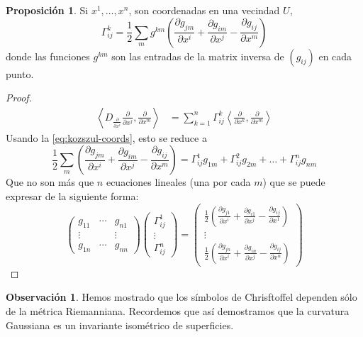 \documentclass[spanish]{book}
\theoremstyle{definition}
\newtheorem*{prop}{Proposición}
\newtheorem*{obs}{Observación}
\begin{document}
	\begin{prop}
		Si $x^1,\ldots,x^n$, son coordenadas en una vecindad $U$,
		\[\Gamma_{ij}^k = \frac{1}{2} \sum_m g^{km}\left( \frac{\partial g_{jm}}{\partial x^i} + \frac{\partial g_{im}}{\partial x^j} - \frac{\partial g_{ij}}{\partial x^m} \right)\]
		donde las funciones $g^{km}$ son las entradas de la matrix inversa de $(g_{ij})$ en cada punto.
	\end{prop}
	\begin{proof}
		\begin{align*}
			\left\langle D_{\frac{\partial}{\partial x^i}}\frac{\partial}{\partial x^j},\frac{\partial}{\partial x^m}\right\rangle&=\sum_{k=1}^n\Gamma_{ij}^k\left\langle\frac{\partial}{\partial x^k},\frac{\partial}{\partial x^m}\right\rangle
		\end{align*}
		Usando la \cref{eq:kozszul-coords}, esto se reduce a
		\[\frac{1}{2} \sum_m \left( \frac{\partial g_{jm}}{\partial x^i} + \frac{\partial g_{im}}{\partial x^j} - \frac{\partial g_{ij}}{\partial x^m} \right)=\Gamma_{ij}^1g_{1m}+\Gamma^2_{ij}g_{2m}+\ldots+\Gamma_{ij}^ng_{nm}\]
		Que no son más que $n$ ecuaciones lineales (una por cada $m$) que se puede expresar de la siguiente forma:
		\[\begin{pmatrix}
			g_{11}&\cdots&g_{n1}\\
			\vdots&&\vdots\\
			g_{1n}&\cdots&g_{nn}
		\end{pmatrix}\begin{pmatrix}
			\Gamma_{ij}^1\\
			\vdots\\
			\Gamma_{ij}^n
		\end{pmatrix}=\begin{pmatrix}
			\frac{1}{2}\left( \frac{\partial g_{j1}}{\partial x^i} + \frac{\partial g_{i1}}{\partial x^j} - \frac{\partial g_{ij}}{\partial x^1} \right)\\
			\vdots\\
			\frac{1}{2} \left( \frac{\partial g_{jn}}{\partial x^i} + \frac{\partial g_{in}}{\partial x^j} - \frac{\partial g_{ij}}{\partial x^n} \right)
		\end{pmatrix}\]
	\end{proof}
	\begin{obs}
		Hemos mostrado que los símbolos de Chrisftoffel dependen sólo de la métrica Riemanniana. Recordemos que así demostramos que la curvatura Gaussiana es un invariante isométrico de superficies.
	\end{obs}
	
\end{document}
